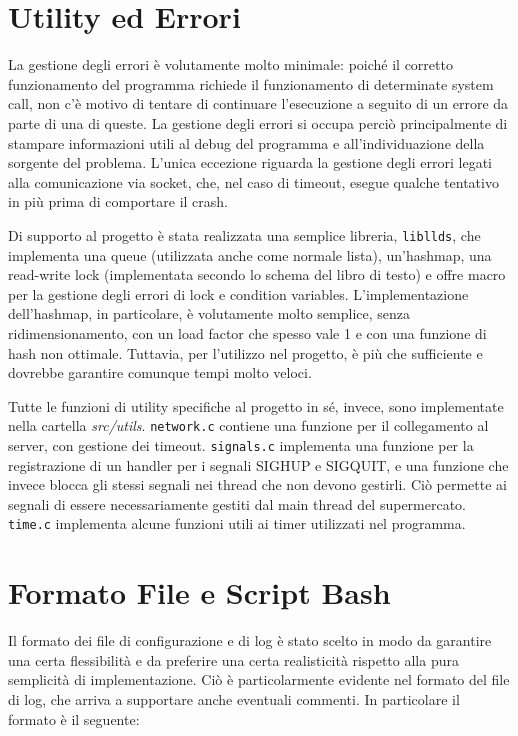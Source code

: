 \documentclass[a4paper,11pt,twoside] {article}
\begin{document}
\section*{Utility ed Errori}

La gestione degli errori è volutamente molto minimale: poiché il corretto funzionamento del programma richiede il funzionamento di determinate system call, non c'è motivo di tentare di continuare l'esecuzione a seguito di un errore da parte di una di queste. La gestione degli errori si occupa perciò principalmente di stampare informazioni utili al debug del programma e all'individuazione della sorgente del problema.
L'unica eccezione riguarda la gestione degli errori legati alla comunicazione via socket, che, nel caso di timeout, esegue qualche tentativo in più prima di comportare il crash.

Di supporto al progetto è stata realizzata una semplice libreria, \lstinline{libllds}, che implementa una queue (utilizzata anche come normale lista), un'hashmap, una read-write lock (implementata secondo lo schema del libro di testo) e offre macro per la gestione degli errori di lock e condition variables. L'implementazione dell'hashmap, in particolare, è volutamente molto semplice, senza ridimensionamento, con un load factor che spesso vale 1 e con una funzione di hash non ottimale. Tuttavia, per l'utilizzo nel progetto, è più che sufficiente e dovrebbe garantire comunque tempi molto veloci.

Tutte le funzioni di utility specifiche al progetto in sé, invece, sono implementate nella cartella \textit{src/utils}. \lstinline{network.c} contiene una funzione per il collegamento al server, con gestione dei timeout. \lstinline{signals.c} implementa una funzione per la registrazione di un handler per i segnali SIGHUP e SIGQUIT, e una funzione che invece blocca gli stessi segnali nei thread che non devono gestirli. Ciò permette ai segnali di essere necessariamente gestiti dal main thread del supermercato. \lstinline{time.c} implementa alcune funzioni utili ai timer utilizzati nel programma.

\section*{Formato File e Script Bash}

Il formato dei file di configurazione e di log è stato scelto in modo da garantire una certa flessibilità e da preferire una certa realisticità rispetto alla pura semplicità di implementazione. Ciò è particolarmente evidente nel formato del file di log, che arriva a supportare anche eventuali commenti. In particolare il formato è il seguente:
\end{document}
